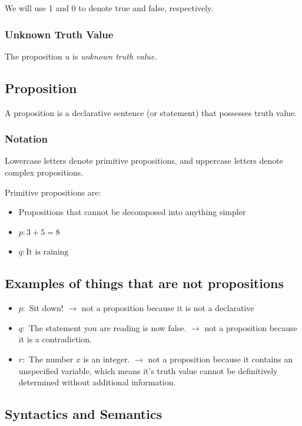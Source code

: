 \documentclass[12pt]{article}
\begin{document}
We will use 1 and 0 to denote true and false, respectively.

\subsubsection{Unknown Truth Value}

The proposition $u$ is \textit{unknown truth value}.

\subsection{Proposition}

A proposition is a declarative sentence (or statement) that possesses truth value.

\subsubsection{Notation}

Lowercase letters denote primitive propositions, and uppercase letters denote
complex propositions.

Primitive propositions are:

\begin{itemize}
\item Propositions that cannot be decomposed into anything simpler
\item $p: 3 + 5 = 8$
\item $q: \text{It is raining}$
\end{itemize}

\subsection{Examples of things that are not propositions}

\begin{itemize}
\item $p:$ Sit down! $\to$ not a proposition because it is not a declarative
\item $q:$ The statement you are reading is now false. $\to$ not a proposition
  because it is a contradiction.
\item $r:$ The number $x$ is an integer. $\to$ not a proposition because it 
  contains an unspecified variable, which means it's truth value cannot be
  definitively determined without additional information.
\end{itemize}

\subsection{Syntactics and Semantics}
\end{document}
